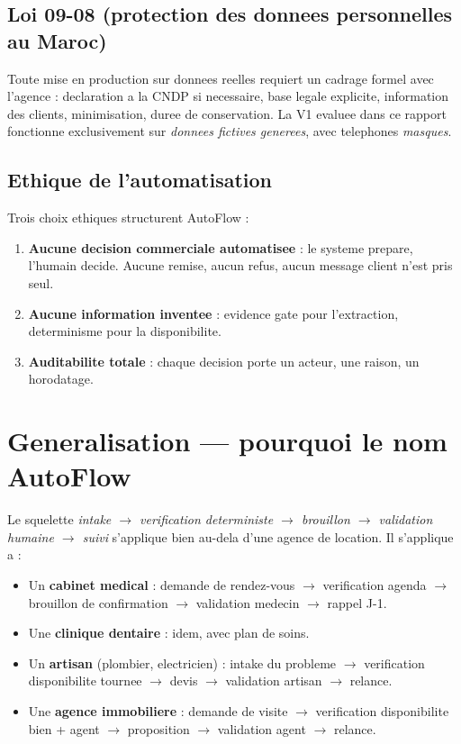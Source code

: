 \documentclass[12pt,a4paper,openany]{report}
\begin{document}
\subsection{Loi 09-08 (protection des donnees personnelles au Maroc)}
Toute mise en production sur donnees reelles requiert un cadrage formel avec l'agence : declaration a la CNDP si necessaire, base legale explicite, information des clients, minimisation, duree de conservation. La V1 evaluee dans ce rapport fonctionne exclusivement sur \emph{donnees fictives generees}, avec telephones \emph{masques}.

\subsection{Ethique de l'automatisation}
Trois choix ethiques structurent AutoFlow :
\begin{enumerate}[leftmargin=1.5cm]
\item \textbf{Aucune decision commerciale automatisee} : le systeme prepare, l'humain decide. Aucune remise, aucun refus, aucun message client n'est pris seul.
\item \textbf{Aucune information inventee} : evidence gate pour l'extraction, determinisme pour la disponibilite.
\item \textbf{Auditabilite totale} : chaque decision porte un acteur, une raison, un horodatage.
\end{enumerate}

\section{Generalisation --- pourquoi le nom AutoFlow}

Le squelette \emph{intake $\rightarrow$ verification deterministe $\rightarrow$ brouillon $\rightarrow$ validation humaine $\rightarrow$ suivi} s'applique bien au-dela d'une agence de location. Il s'applique a :
\begin{itemize}[leftmargin=1.5cm]
\item Un \textbf{cabinet medical} : demande de rendez-vous $\rightarrow$ verification agenda $\rightarrow$ brouillon de confirmation $\rightarrow$ validation medecin $\rightarrow$ rappel J-1.
\item Une \textbf{clinique dentaire} : idem, avec plan de soins.
\item Un \textbf{artisan} (plombier, electricien) : intake du probleme $\rightarrow$ verification disponibilite tournee $\rightarrow$ devis $\rightarrow$ validation artisan $\rightarrow$ relance.
\item Une \textbf{agence immobiliere} : demande de visite $\rightarrow$ verification disponibilite bien + agent $\rightarrow$ proposition $\rightarrow$ validation agent $\rightarrow$ relance.
\end{itemize}
\end{document}
